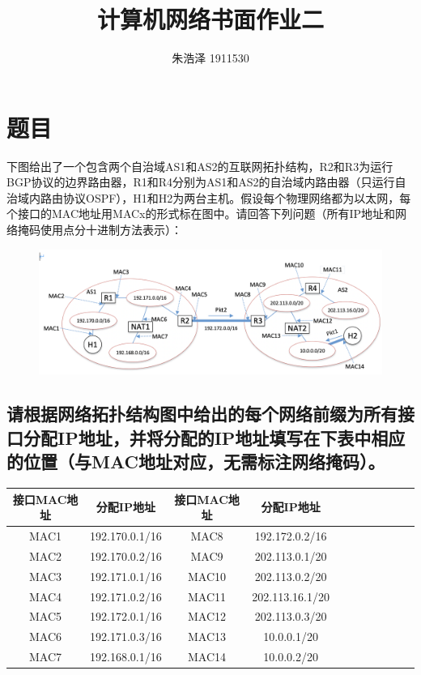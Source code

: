 \documentclass{article}
\begin{document}
\title{计算机网络书面作业二}
\author{朱浩泽 1911530}
\maketitle
\section*{题目}
下图给出了一个包含两个自治域AS1和AS2的互联网拓扑结构，R2和R3为运行BGP协议的边界路由器，R1和R4分别为AS1和AS2的自治域内路由器（只运行自治域内路由协议OSPF），H1和H2为两台主机。假设每个物理网络都为以太网，每个接口的MAC地址用MACx的形式标在图中。请回答下列问题（所有IP地址和网络掩码使用点分十进制方法表示）：
\begin{figure}[H]
    \centering
    \includegraphics[scale=0.4]{1.png}
\end{figure}
\subsection{请根据网络拓扑结构图中给出的每个网络前缀为所有接口分配IP地址，并将分配的IP地址填写在下表中相应的位置（与MAC地址对应，无需标注网络掩码）。}
\begin{table}[!htbp]
  \centering
  \begin{tabular}{ccccccccccc}
  \toprule  
  接口MAC地址&分配IP地址& 接口MAC地址& 分配IP地址\\
  \midrule
  MAC1&192.170.0.1/16 & MAC8&192.172.0.2/16 \\
  MAC2&192.170.0.2/16 & MAC9&202.113.0.1/20\\
  MAC3&192.171.0.1/16 & MAC10&202.113.0.2/20 \\
  MAC4&192.171.0.2/16 & MAC11&202.113.16.1/20 \\
  MAC5&192.172.0.1/16 & MAC12&202.113.0.3/20 \\
  MAC6&192.171.0.3/16 & MAC13&10.0.0.1/20\\
  MAC7&192.168.0.1/16 & MAC14&10.0.0.2/20 \\
  \bottomrule
  \end{tabular}
\end{table}
\end{document}
